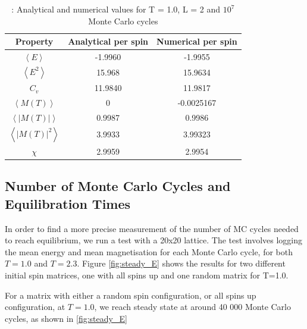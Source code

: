 \documentclass{article}
\begin{document}
	{\renewcommand{\arraystretch}{1.5}
	\begin{table}[h!]
		\caption{: Analytical and numerical values for T = 1.0, L = 2 and $10^7$ Monte Carlo cycles }
			\label{Tab: values}
			\centering
		\begin{tabular}{c c c}
			Property & Analytical per spin & Numerical per spin \\
			\hline
			$\left<E\right>$  & -1.9960 & -1.9955\\
			$\left<E^2\right>$ & 15.968  &15.9634 \\
			$C_v$ & 11.9840 & 11.9817 \\
			$\left<M(T)\right>$ & 0 & -0.0025167\\
			$\left<|M(T)|\right>$ & 0.9987 & 0.9986\\
			$\left<|M(T)|^2\right>$  & 3.9933 & 3.99323\\
			$\chi$  & 2.9959 & 2.9954\\
		\end{tabular}
	\end{table}

	\subsection{Number of Monte Carlo Cycles and Equilibration Times}
		In order to find a more precise measurement of the number of MC cycles needed to reach equilibrium, we run a test with a 20x20 lattice. The test involves logging the mean energy and mean magnetisation for each Monte Carlo cycle, for both $T=1.0$ and $T=2.3$. Figure \ref{fig:steady_E} shows the results for two different initial spin matrices, one with all spins up and one random matrix for T=1.0.

		For a matrix with either a random spin configuration, or all spins up configuration, at $T=1.0$, we reach steady state at around 40 000 Monte Carlo cycles, as shown in \ref{fig:steady_E}

}
\end{document}
